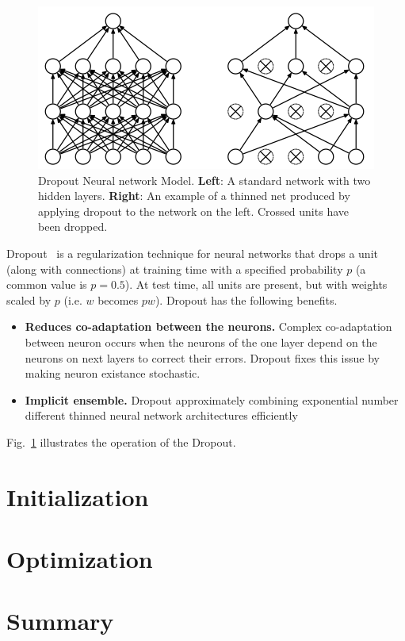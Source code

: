 \begin{figure}
    \begin{center}
        \includegraphics[width=\textwidth]{Figures/oriDropout.png}
        \caption{\label{fig:Dropout} Dropout Neural network Model. \textbf{Left}: A standard network with two hidden layers. \textbf{Right}: An example of a thinned net produced by applying dropout to the network on the left. Crossed units have been dropped.}
    \end{center}
\end{figure}
Dropout~\cite{srivastava2014dropout} is a regularization technique for neural networks that drops a unit (along with connections) at training time with a specified probability $p$ (a common value is $p=0.5$). At test time, all units are present, but with weights scaled by $p$ (i.e. $w$ becomes $pw$).
Dropout has the following benefits. 
\begin{itemize}
    \item \textbf{Reduces co-adaptation between the neurons.} Complex co-adaptation between neuron occurs when the neurons of the one layer depend on the neurons on next layers to correct their errors. Dropout fixes this issue by making neuron existance stochastic.
    \item \textbf{Implicit ensemble.} Dropout  approximately combining exponential number different thinned neural network architectures efficiently
\end{itemize}
Fig.~\ref{fig:Dropout} illustrates the operation of the Dropout.

\section{Initialization}

\section{Optimization}

\section{Summary}